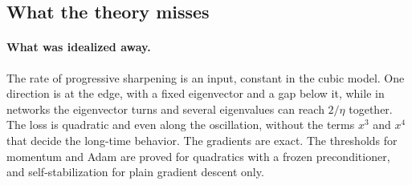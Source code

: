 \begin{refsection}
\section{What the theory misses}\label{sec:eos:misses}

\paragraph{What was idealized away.} The rate of progressive sharpening is an input, constant in the cubic model. One direction is at the edge, with a fixed eigenvector and a gap below it, while in networks the eigenvector turns and several eigenvalues can reach $2/\eta$ together. The loss is quadratic and even along the oscillation, without the terms $x^3$ and $x^4$ that decide the long-time behavior. The gradients are exact. The thresholds for momentum and Adam are proved for quadratics with a frozen preconditioner, and self-stabilization for plain gradient descent only.


\end{refsection}
